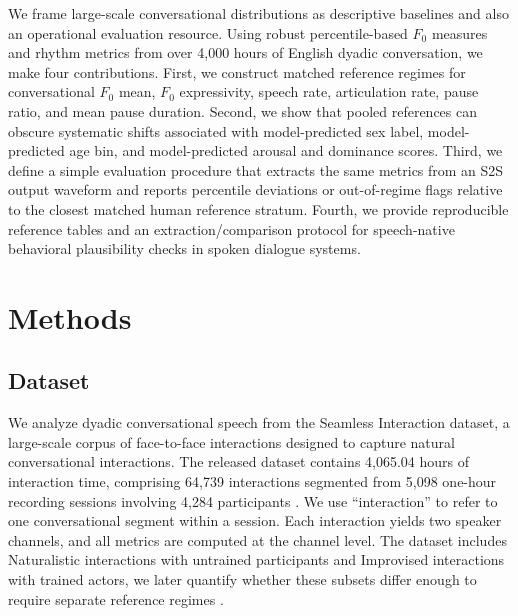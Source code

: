 \documentclass[conference]{IEEEtran}
\begin{document}
We frame large-scale conversational distributions as descriptive baselines and also an operational evaluation resource. 
Using robust percentile-based $F_0$ measures and rhythm metrics from over 4{,}000 hours of English dyadic conversation, we make four contributions. 
First, we construct matched reference regimes for conversational $F_0$ mean, $F_0$ expressivity, speech rate, articulation rate, pause ratio, and mean pause duration. 
Second, we show that pooled references can obscure systematic shifts associated with model-predicted sex label, model-predicted age bin, and model-predicted arousal and dominance scores. 
Third, we define a simple evaluation procedure that extracts the same metrics from an S2S output waveform and reports percentile deviations or out-of-regime flags relative to the closest matched human reference stratum. 
Fourth, we provide reproducible reference tables and an extraction/comparison protocol for speech-native behavioral plausibility checks in spoken dialogue systems.

\section{Methods}

\subsection{Dataset}
We analyze dyadic conversational speech from the Seamless Interaction dataset, a large-scale corpus of face-to-face interactions designed to capture natural conversational interactions.
The released dataset contains 4,065.04 hours of interaction time, comprising 64,739 interactions segmented from 5,098 one-hour recording sessions involving 4,284 participants \cite{seamless_interaction}. 
We use ``interaction'' to refer to one conversational segment within a session. 
Each interaction yields two speaker channels, and all metrics are computed at the channel level. 
The dataset includes Naturalistic interactions with untrained participants and Improvised interactions with trained actors, we later quantify whether these subsets differ enough to require separate reference regimes \cite{fusaroli_dialog_2014, wynn_conversational_2024}.
\end{document}
